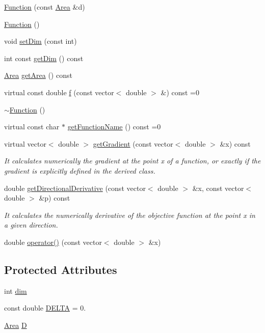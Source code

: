 \begin{DoxyCompactItemize}
\item 
\hyperlink{class_function_a7055e57520effff828782ea44498c3e3}{Function} (const \hyperlink{class_area}{Area} \&d)
\item 
\hyperlink{class_function_ae206568fd4fd4c885e3ccff76345c4e6}{Function} ()
\item 
void \hyperlink{class_function_a8c8f0ba3282431096ce7397c89357cef}{set\+Dim} (const int)
\item 
int const \hyperlink{class_function_a6d8e35610e59d11da7c21da19b061bac}{get\+Dim} () const
\item 
\hyperlink{class_area}{Area} \hyperlink{class_function_a8407865d197005fb990c87f83fd020b0}{get\+Area} () const
\item 
virtual const double \hyperlink{class_function_a81ec299f137e34109246cde88d88c949}{f} (const vector$<$ double $>$ \&) const =0
\item 
\hyperlink{class_function_a3b03f7cf0b75d16edebdda1dee1db6fd}{$\sim$\+Function} ()
\item 
virtual const char $\ast$ \hyperlink{class_function_ab19392e324813377fc6171bf354c24fb}{get\+Function\+Name} () const =0
\item 
virtual vector$<$ double $>$ \hyperlink{class_function_a9f2d70a7cf5875661a0f3b0e115dedc2}{get\+Gradient} (const vector$<$ double $>$ \&x) const
\begin{DoxyCompactList}\small\item\em It calculates numerically the gradient at the point x of a function, or exactly if the gradient is explicitly defined in the derived class. \end{DoxyCompactList}\item 
double \hyperlink{class_function_af463683db78c587160ca6040083f3deb}{get\+Directional\+Derivative} (const vector$<$ double $>$ \&x, const vector$<$ double $>$ \&p) const
\begin{DoxyCompactList}\small\item\em It calculates the numerically derivative of the objective function at the point x in a given direction. \end{DoxyCompactList}\item 
double \hyperlink{class_function_ae890d237648f6320730436a66920a6e7}{operator()} (const vector$<$ double $>$ \&x)
\end{DoxyCompactItemize}
\subsection*{Protected Attributes}
\begin{DoxyCompactItemize}
\item 
int \hyperlink{class_function_a4b8560408fbefc8a791b70f35959d3a1}{dim}
\item 
const double \hyperlink{class_function_af29cd370469d8dbea0a7b5c3b0925323}{D\+E\+L\+TA} = 0.
\item 
\hyperlink{class_area}{Area} \hyperlink{class_function_a03b771b5e5eb0acd456cd897b04edbab}{D}
\end{DoxyCompactItemize}
